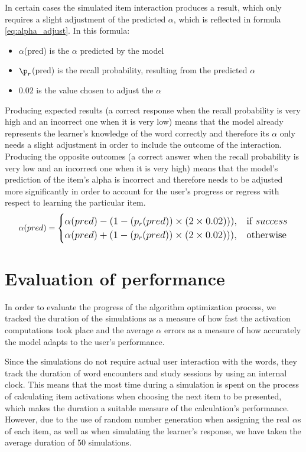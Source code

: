 \documentclass[a4paper]{report}
\begin{document}
In certain cases the simulated item interaction produces a result, which only requires a slight adjustment of the predicted $\alpha$, which is reflected in formula \ref{eq:alpha_adjust}. In this formula:
\begin{itemize}
    \item $\alpha$(pred) is the $\alpha$ predicted by the model
    \item $\p_r$(pred) is the recall probability, resulting from the predicted $\alpha$
    \item $0.02$ is the value chosen to adjust the $\alpha$
\end{itemize}
Producing expected results (a correct response when the recall probability is very high and an incorrect one when it is very low) means that the model already represents the learner's knowledge of the word correctly and therefore its $\alpha$ only needs a slight adjustment in order to include the outcome of the interaction. Producing the opposite outcomes (a correct answer when the recall probability is very low and an incorrect one when it is very high) means that the model's prediction of the item's alpha is incorrect and therefore needs to be adjusted more significantly in order to account for the user's progress or regress with respect to learning the particular item.
\begin{equation}
\begin{large}
\label{eq:alpha_adjust}
\alpha(pred) = 
\begin{cases}
    \alpha(pred) - (1 - (p_r(pred)) \times (2 \times 0.02))), & \text{if } success\\
    \alpha(pred) + (1 - (p_r(pred)) \times (2 \times 0.02))),  & \text{otherwise}
\end{cases}
\end{large}
\end{equation}

\section{Evaluation of performance}
In order to evaluate the progress of the algorithm optimization process, we tracked the duration of the simulations as a measure of how fast the activation computations took place and the average $\alpha$ errors as a measure of how accurately the model adapts to the user's performance.

Since the simulations do not require actual user interaction with the words, they track the duration of word encounters and study sessions by using an internal clock. This means that the most time during a simulation is spent on the process of calculating item activations when choosing the next item to be presented, which makes the duration a suitable measure of the calculation's performance. However, due to the use of random number generation when assigning the real $\alpha$s of each item, as well as when simulating the learner's response, we have taken the average duration of 50 simulations.
\end{document}
